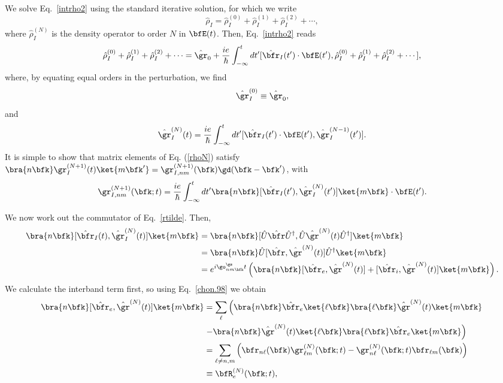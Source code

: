 \documentclass[floatfix,prb,aps,superscriptaddress,11pt,preprint,letterpaper]{revtex4}
\begin{document}
We solve Eq.~\eqref{intrho2} using the standard iterative
solution, for which we write
\begin{equation}\label{rhop}
\hat\rho_I=\hat\rho_I^{(0)}+\hat\rho_I^{(1)}+\hat\rho_I^{(2)}+\cdots
,
\end{equation}
where $\hat\rho_I^{(N)}$ is the density operator to order $N$ in $\bfE(t)$.
Then, Eq.~\eqref{intrho2} reads
\begin{equation}\label{intrho3}
\hat\rho_I^{(0)}+\hat\rho_I^{(1)}+\hat\rho_I^{(2)}+\cdots
=\hat\gr_0
+
\frac{ie}{\hbar}\int_{-\infty}^t dt'[\hat\bfr_I(t')\cdot\bfE(t'),
\hat\rho_I^{(0)}+\hat\rho_I^{(1)}+\hat\rho_I^{(2)}+\cdots
]
,
\end{equation}
where, by equating equal orders in the perturbation, we find
\begin{equation}\label{rho0}
\hat\gr_I^{(0)}\equiv\hat\gr_0
,
\end{equation}
and
\begin{equation}\label{rhoN}
\hat\gr_I^{(N)}(t)=
\frac{ie}{\hbar}
\int_{-\infty}^t dt'[\hat\bfr_I(t')\cdot\bfE(t'),\hat\gr^{(N-1)}_I(t')].
\end{equation}
It is simple to show that matrix elements of Eq. (\ref{rhoN}) satisfy
$\bra{n\bfk}\gr_I^{(N+1)}(t)\ket{m\bfk'}=\gr^{(N+1)}_{I,nm}(\bfk)\gd(\bfk-\bfk')$,
with
\begin{equation}\label{rtilde}
\gr^{(N+1)}_{I,nm}(\bfk;t)
=\frac{ie}{\hbar}\int_{-\infty}^t dt'
\bra{n\bfk}
[\hat\bfr_I(t'),\hat\gr^{(N)}_I(t')]
\ket{m\bfk}
\cdot\bfE(t')
.
\end{equation}

We now work out the commutator of Eq.~\eqref{rtilde}. Then,
\begin{align}\label{conmu1}
\bra{n\bfk}
[\hat\bfr_I(t),\hat\gr^{(N)}_I(t)]
\ket{m\bfk}
&=
\bra{n\bfk}
[\hat{U}\hat\bfr\hat{U}^\dagger,\hat{U}\hat\gr^{(N)}(t)\hat{U}^\dagger]
\ket{m\bfk}
\nonumber \\
&=
\bra{n\bfk}
\hat{U}[\hat\bfr,\hat\gr^{(N)}(t)]\hat{U}^\dagger
\ket{m\bfk}
\\
&=
e^{i\go^\gs_{nm\bfk}t}
\left(
\bra{n\bfk}
[\hat\bfr_e,\hat\gr^{(N)}(t)]
+
[\hat\bfr_i,\hat\gr^{(N)}(t)]
\ket{m\bfk}
\right)
\nonumber
.
\end{align}
We calculate the interband term first, so using Eq.~\eqref{chon.98} we obtain
\begin{align}\label{conmu2}
\bra{n\bfk}
[\hat\bfr_e,\hat\gr^{(N)}(t)]
\ket{m\bfk}
&=
\sum_{\ell}
\left(
\bra{n\bfk}
\hat\bfr_e
\ket{\ell\bfk}
\bra{\ell\bfk}
\hat\gr^{(N)}(t)
\ket{m\bfk}
\right.
\nonumber \\
&
\left.
-
\bra{n\bfk}
\hat\gr^{(N)}(t)
\ket{\ell\bfk}
\bra{\ell\bfk}
\hat\bfr_e
\ket{m\bfk}
\right)
\nonumber \\
&=
\sum_{\ell\ne n,m}
\left(
\bfr_{n\ell}(\bfk)
\gr^{(N)}_{\ell m}(\bfk;t)
-
\gr^{(N)}_{n\ell}(\bfk;t)
\bfr_{\ell m}(\bfk)
\right)
\nonumber\\
&\equiv
\bfR^{(N)}_e(\bfk;t)
,
\end{align}
\end{document}
